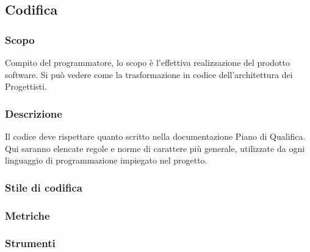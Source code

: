 \subsection{Codifica}
\subsubsection{Scopo}
Compito del programmatore, lo scopo è l’effettiva realizzazione del prodotto software. Si può vedere come la trasformazione in codice dell’architettura dei Progettisti.

\subsubsection{Descrizione}
Il codice deve rispettare quanto scritto nella documentazione Piano di Qualifica. Qui saranno elencate regole e norme di carattere più generale, utilizzate da ogni linguaggio di programmazione impiegato nel progetto.

\subsubsection{Stile di codifica}
\subsubsection{Metriche}
\subsubsection{Strumenti}

